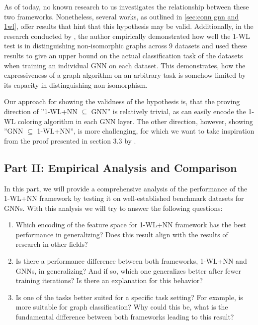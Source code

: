 \documentclass[11pt, dvipsnames, DIV=12]{scrreprt}
\theoremstyle{definition}
\begin{document}
As of today, no known research to us investigates the relationship between these two frameworks. Nonetheless, several works, as outlined in \ref{sec:conn gnn and 1wl}, offer results that hint that this hypothesis may be valid.  Additionally, in the research conducted by \cite{Zopf2022}, the author empirically demonstrated how well the 1-WL test is in distinguishing non-isomorphic graphs across 9 datasets and used these results to give an upper bound on the actual classification task of the datasets when training an individual GNN on each dataset. This demonstrates, how the expressiveness of a graph algorithm on an arbitrary task is somehow limited by its capacity in distinguishing non-isomorphism.

Our approach for showing the validness of the hypothesis is, that the proving direction of ''1-WL+NN $\subseteq$ GNN'' is relatively trivial, as can easily encode the 1-WL coloring algorithm in each GNN layer. The other direction, however, showing ''GNN $\subseteq$ 1-WL+NN'', is more challenging, for which we want to take inspiration from the proof presented in section 3.3 by \cite{Xu2018}.

\subsection{Part II: Empirical Analysis and Comparison}
In this part, we will provide a comprehensive analysis of the performance of the 1-WL+NN framework by testing it on well-established benchmark datasets for GNNs. With this analysis we will try to answer the following questions:
\begin{enumerate}[label=Q\arabic*)]
    \item Which encoding of the feature space for 1-WL+NN framework has the best performance in generalizing? Does this result align with the results of research in other fields?
    \item Is there a performance difference between both frameworks, 1-WL+NN and GNNs, in generalizing? And if so, which one generalizes better after fewer training iterations? Is there an explanation for this behavior?
    \item Is one of the tasks better suited for a specific task setting? For example, is more suitable for graph classification? Why could this be, what is the fundamental difference between both frameworks leading to this result?
\end{enumerate}
\end{document}
